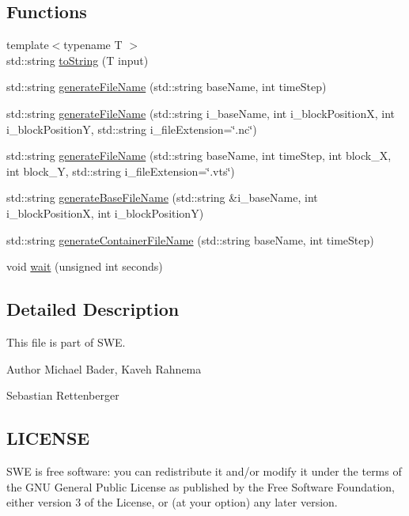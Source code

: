 \subsection*{Functions}
\begin{DoxyCompactItemize}
\item 
{\footnotesize template$<$typename T $>$ }\\std\-::string \hyperlink{help_8hh_a7824e0dc9a06a7ab03df4c0bd0ddcd83}{to\-String} (T input)
\item 
std\-::string \hyperlink{help_8hh_aa10dc278c6ac60f9cd49955cbe16fbcb}{generate\-File\-Name} (std\-::string base\-Name, int time\-Step)
\item 
std\-::string \hyperlink{help_8hh_a206f33ce37fa47f8635d02a1cfc9881f}{generate\-File\-Name} (std\-::string i\-\_\-base\-Name, int i\-\_\-block\-Position\-X, int i\-\_\-block\-Position\-Y, std\-::string i\-\_\-file\-Extension=\char`\"{}.nc\char`\"{})
\item 
std\-::string \hyperlink{help_8hh_ab05bce4e4d30d0b9fb85f81668f98f79}{generate\-File\-Name} (std\-::string base\-Name, int time\-Step, int block\-\_\-\-X, int block\-\_\-\-Y, std\-::string i\-\_\-file\-Extension=\char`\"{}.vts\char`\"{})
\item 
std\-::string \hyperlink{help_8hh_a7dc37444a6b7771aefff04a38e74e086}{generate\-Base\-File\-Name} (std\-::string \&i\-\_\-base\-Name, int i\-\_\-block\-Position\-X, int i\-\_\-block\-Position\-Y)
\item 
std\-::string \hyperlink{help_8hh_a427928180ec14bf889c55e5cc51d8e36}{generate\-Container\-File\-Name} (std\-::string base\-Name, int time\-Step)
\item 
void \hyperlink{help_8hh_a3db4e4545e5a3f2655ff1a749ca0ed6e}{wait} (unsigned int seconds)
\end{DoxyCompactItemize}


\subsection{Detailed Description}
This file is part of S\-W\-E.

\begin{DoxyAuthor}{Author}
Michael Bader, Kaveh Rahnema 

Sebastian Rettenberger
\end{DoxyAuthor}
\hypertarget{Writer_8hh_LICENSE}{}\subsection{L\-I\-C\-E\-N\-S\-E}\label{Writer_8hh_LICENSE}
S\-W\-E is free software\-: you can redistribute it and/or modify it under the terms of the G\-N\-U General Public License as published by the Free Software Foundation, either version 3 of the License, or (at your option) any later version.


